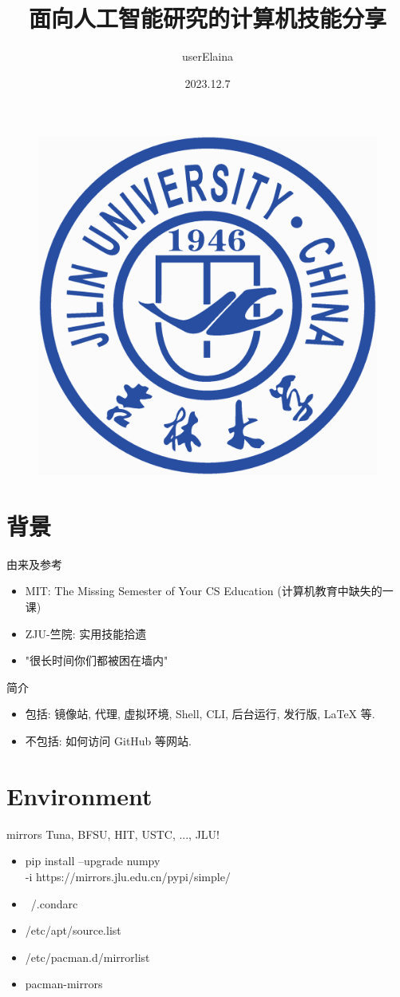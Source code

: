 \documentclass{beamer}
\author{userElaina}
\title{面向人工智能研究的计算机技能分享}
\institute{人工智能学院}
\date{2023.12.7}
\begin{document}
\kaishu
\begin{frame}
    \titlepage
    \begin{figure}[htpb]
        \begin{center}
            \includegraphics[width=0.15\linewidth]{pic/Jilin_University_Logo.eps}
        \end{center}
    \end{figure}
\end{frame}

\begin{frame}
\tableofcontents[sectionstyle=show,subsectionstyle=show/shaded/hide,subsubsectionstyle=show/shaded/hide]
\end{frame}

\section{背景}

\begin{frame}{由来及参考}
    \begin{itemize}
        \item MIT: The Missing Semester of Your CS Education (计算机教育中缺失的一课)
        \item ZJU-竺院: 实用技能拾遗
        \item "很长时间你们都被困在墙内"
    \end{itemize}
\end{frame}

\begin{frame}{简介}
    \begin{itemize}
        \item 包括: 镜像站, 代理, 虚拟环境, Shell, CLI, 后台运行, 发行版, LaTeX 等.
        \item 不包括: 如何访问 GitHub 等网站.
    \end{itemize}
\end{frame}

\section{Environment}

\begin{frame}{mirrors}
    Tuna, BFSU, HIT, USTC, ..., JLU!
    \begin{itemize}
        \tt
        \item pip install --upgrade numpy \\ -i https://mirrors.jlu.edu.cn/pypi/simple/
        \item ~/.condarc
        \item /etc/apt/source.list
        \item /etc/pacman.d/mirrorlist
        \item pacman-mirrors
    \end{itemize}
\end{frame}
\end{document}
